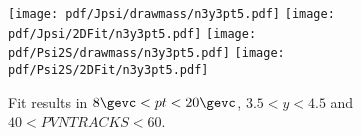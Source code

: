 \begin{figure}[H]
\begin{center}
\texttt{[image: pdf/Jpsi/drawmass/n3y3pt5.pdf]}
\texttt{[image: pdf/Jpsi/2DFit/n3y3pt5.pdf]}
\vspace*{-0.5cm}
\texttt{[image: pdf/Psi2S/drawmass/n3y3pt5.pdf]}
\texttt{[image: pdf/Psi2S/2DFit/n3y3pt5.pdf]}
\vspace*{-0.5cm}
\end{center}
\caption{Fit results in $8\gevc<pt<20\gevc$, $3.5<y<4.5$ and $40<PVNTRACKS<60$.}
\label{Fitn3y3pt5}
\end{figure}
